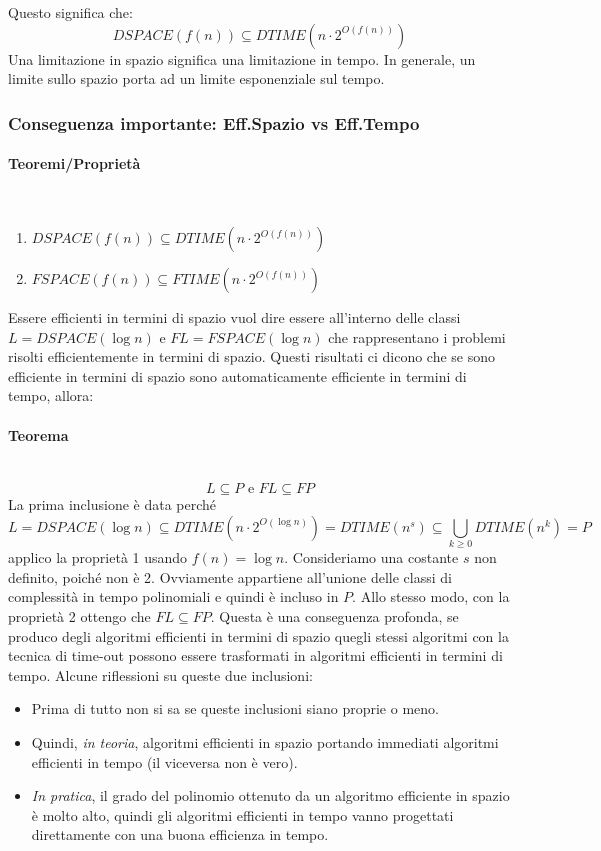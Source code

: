\documentclass{article}
\begin{document}
Questo significa che:
$$DSPACE(f(n))\subseteq DTIME(n\cdot 2^{O(f(n))})$$
Una limitazione in spazio significa una limitazione in tempo. In generale, un limite sullo spazio porta
ad un limite esponenziale sul tempo.

\subsubsection{Conseguenza importante: Eff.Spazio vs Eff.Tempo}
\paragraph{Teoremi/Proprietà}\mbox{}\\
\begin{enumerate}
    \item $DSPACE(f(n))\subseteq DTIME(n\cdot 2^{O(f(n))})$
    \item $FSPACE(f(n))\subseteq FTIME(n\cdot 2^{O(f(n))})$
\end{enumerate}
Essere efficienti in termini di spazio vuol dire essere all'interno delle classi
$L=DSPACE(\log n)$ e $FL=FSPACE(\log n)$ che
rappresentano i problemi risolti efficientemente in termini di spazio.
Questi risultati ci dicono che se sono efficiente in termini di spazio sono automaticamente
efficiente in termini di tempo, allora:
\paragraph{Teorema}\mbox{}\\
$$L\subseteq P\text{ e }FL\subseteq FP$$
La prima inclusione è data perché
$$L=DSPACE(\log n)\subseteq DTIME(n\cdot 2^{O(\log n)})=DTIME(n^s)\subseteq \bigcup_{k\geq 0}DTIME(n^k)=P$$
applico la proprietà 1 usando $f(n)=\log n$. Consideriamo una costante $s$ non definito,
poiché non è 2. Ovviamente appartiene all'unione delle classi di complessità in tempo polinomiali
e quindi è incluso in $P$. Allo stesso modo, con la proprietà 2 ottengo che $FL\subseteq FP$.
Questa è una conseguenza profonda, se produco degli algoritmi efficienti in termini di spazio
quegli stessi algoritmi con la tecnica di time-out possono essere trasformati in algoritmi efficienti
in termini di tempo.
Alcune riflessioni su queste due inclusioni:
\begin{itemize}
    \item Prima di tutto non si sa se queste inclusioni siano proprie o meno.
    \item Quindi, \textit{in teoria}, algoritmi efficienti in spazio portando immediati
          algoritmi efficienti in tempo (il viceversa non è vero).
    \item \textit{In pratica}, il grado del polinomio ottenuto da un algoritmo efficiente
          in spazio è molto alto, quindi gli algoritmi efficienti in tempo vanno progettati
          direttamente con una buona efficienza in tempo.
\end{itemize}
\end{document}

